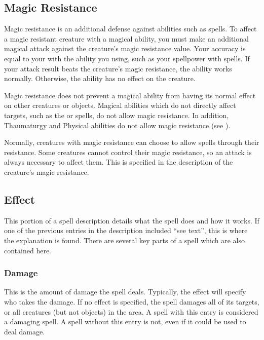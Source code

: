 
    \subsection{Magic Resistance}\label{Magic Resistance}
        Magic resistance is an additional defense against  abilities such as spells.
        To affect a magic resistant creature with a magical ability, you must make an additional magical attack against the creature's magic resistance value.
        Your accuracy is equal to your  with the ability you using, such as your spellpower with spells.
        If your attack result beats the creature's magic resistance, the ability works normally.
        Otherwise, the ability has no effect on the creature.

        Magic resistance does not prevent a magical ability from having its normal effect on other creatures or objects.
        Magical abilities which do not directly affect targets, such as the  or  spells, do not allow magic resistance.
        In addition, Thaumaturgy and Physical abilities do not allow magic resistance (see ).

        Normally, creatures with magic resistance can choose to allow spells through their resistance.
        Some creatures cannot control their magic resistance, so an attack is always necessary to affect them.
        This is specified in the description of the creature's magic resistance.

    \subsection{Effect}
        This portion of a spell description details what the spell does and how it works.
        If one of the previous entries in the description included ``see text'', this is where the explanation is found.
        There are several key parts of a spell which are also contained here.

        \subsubsection{Damage}
            This is the amount of damage the spell deals.
            Typically, the effect will specify who takes the damage.
            If no effect is specified, the spell damages all of its targets, or all creatures (but not objects) in the area.
            A spell with this entry is considered a damaging spell.
            A spell without this entry is not, even if it could be used to deal damage.

